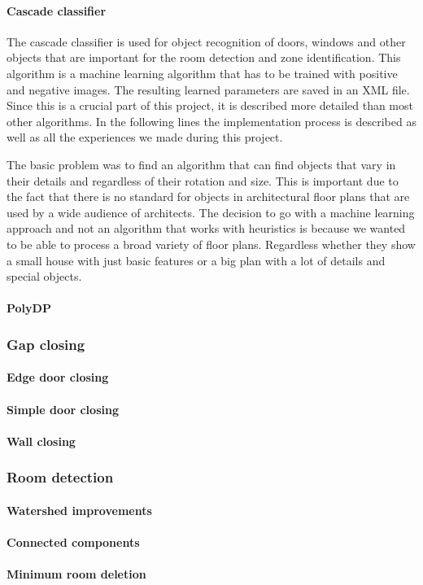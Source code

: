 \paragraph{Cascade classifier}
\label{sub:ImpCascadeClassifier}
The cascade classifier is used for object recognition of doors, windows and other objects that are important for the room detection and zone identification. This algorithm is a machine learning algorithm that has to be trained with positive and negative images. The resulting learned parameters are saved in an XML file. Since this is a crucial part of this project, it is described more detailed than most other algorithms. In the following lines the implementation process is described as well as all the experiences we made during this project.

The basic problem was to find an algorithm that can find objects that vary in their details and regardless of their rotation and size. This is important due to the fact that there is no standard for objects in architectural floor plans that are used by a wide audience of architects. The decision to go with a machine learning approach and not an algorithm that works with heuristics is because we wanted to be able to process a broad variety of floor plans. Regardless whether they show a small house with just basic features or a big plan with a lot of details and special objects.

\paragraph{PolyDP}

\subsubsection{Gap closing}
\paragraph{Edge door closing}
\paragraph{Simple door closing}
\paragraph{Wall closing}
\label{sub:WallClosing}
\subsubsection{Room detection}
\paragraph{Watershed improvements}
\paragraph{Connected components}
\paragraph{Minimum room deletion}


